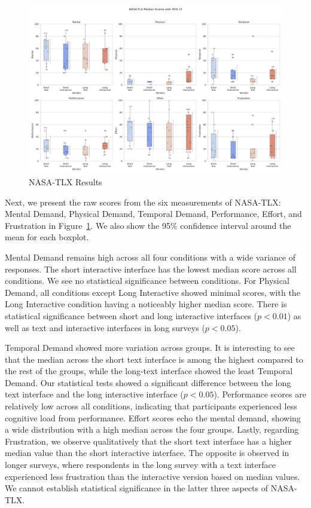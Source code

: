 \begin{figure}[h]
    \centering
    \includegraphics[width=\textwidth]{content/image/results/nasatlx_final_value_with_CI.pdf}
    \caption{NASA-TLX Results}
    \label{fig:nasatlx-with-ci}
\end{figure}

Next, we present the raw scores from the six measurements of NASA-TLX: Mental Demand, Physical Demand, Temporal Demand, Performance, Effort, and Frustration in Figure~\ref{fig:nasatlx-with-ci}. We also show the 95\% confidence interval around the mean for each boxplot.

Mental Demand remains high across all four conditions with a wide variance of responses. The short interactive interface has the lowest median score across all conditions. We see no statistical significance between conditions. For Physical Demand, all conditions except Long Interactive showed minimal scores, with the Long Interactive condition having a noticeably higher median score. There is statistical significance between short and long interactive interfaces ($p<0.01$) as well as text and interactive interfaces in long surveys ($p<0.05$).

Temporal Demand showed more variation across groups. It is interesting to see that the median across the short text interface is among the highest compared to the rest of the groups, while the long-text interface showed the least Temporal Demand. Our statistical tests showed a significant difference between the long text interface and the long interactive interface ($p<0.05$). Performance scores are relatively low across all conditions, indicating that participants experienced less cognitive load from performance. Effort scores echo the mental demand, showing a wide distribution with a high median across the four groups. Lastly, regarding Frustration, we observe qualitatively that the short text interface has a higher median value than the short interactive interface. The opposite is observed in longer surveys, where respondents in the long survey with a text interface experienced less frustration than the interactive version based on median values. We cannot establish statistical significance in the latter three aspects of NASA-TLX.

